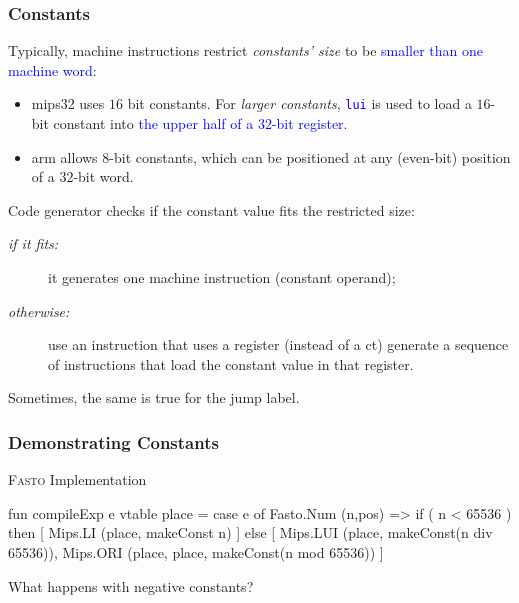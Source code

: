 \documentclass{beamer}
\newcommand{\blue}[1]{\textcolor{Blue}{{#1}}}
\renewcommand{\emph}[1]{\textcolor{structure}{#1}}
\newcommand{\emp}[1]{\textcolor{DikuRed}{ #1}}
\begin{document}
\begin{frame}[fragile,t]
   \frametitle{Constants}

\bigskip

Typically, machine instructions restrict \emp{\em constants' size} to be 
\blue{smaller than one machine word}:\smallskip

\begin{itemize}

    \item {\sc mips32} uses $16$ bit constants. For \emp{\em larger constants}, \blue{\tt lui} 
        is used to load a $16$-bit constant into \blue{the upper half of a $32$-bit register}.\smallskip

    \item {\sc arm} allows $8$-bit constants, which can be positioned at any 
            (even-bit) position of a $32$-bit word.

\end{itemize}


\bigskip

\emp{Code generator checks if the constant value fits the restricted size:}

\begin{description}

    \item[{\em if it fits:}] it generates one machine instruction (constant operand);\smallskip

    \item[{\em otherwise:}] use an instruction that uses a register (instead of a ct)
            generate a sequence of instructions that load the
            constant value in that register.

\end{description}

\bigskip

\emp{Sometimes, the same is true for the jump label.}

\end{frame}


\begin{frame}[fragile,t]
    \frametitle{Demonstrating Constants}

\begin{block}{\textsc{Fasto} Implementation}
\begin{colorcode}[fontsize=\scriptsize]
fun compileExp e vtable place =
    case e of
      Fasto.Num (n,pos)   =>
        if ( \emph{n < 65536} )
        then [ \emph{Mips.LI (place, makeConst n)}                    ]
        else [ \emp{Mips.LUI (place, makeConst(n div 65536)),}
               \emp{Mips.ORI (place, place, makeConst(n mod 65536))} ]
\end{colorcode} 
\end{block}

\bigskip

\emp{What happens with negative constants?}

\end{frame}
\end{document}
